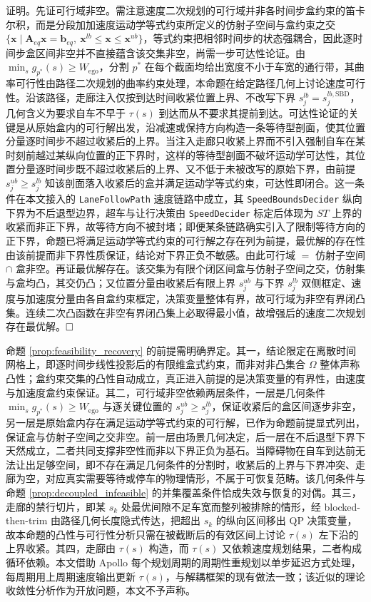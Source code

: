 \documentclass[a4paper,11pt]{ctexart}
\theoremstyle{definition}
\begin{document}
证明。先证可行域非空。需注意速度二次规划的可行域并非各时间步盒约束的笛卡尔积，而是分段加加速度运动学等式约束所定义的仿射子空间与盒约束之交 $\{\mathbf{x}\mid \mathbf{A}_{eq}\mathbf{x}=\mathbf{b}_{eq},\ \mathbf{x}^{lb}\le\mathbf{x}\le\mathbf{x}^{ub}\}$，等式约束把相邻时间步的状态强耦合，因此逐时间步盒区间非空并不直接蕴含该交集非空，尚需一步可达性论证。由 $\min_s g_{p^{*}}(s) \geq W_{\text{ego}}$，分割 $p^{*}$ 在每个截面均给出宽度不小于车宽的通行带，其曲率可行性由路径二次规划的曲率约束处理，本命题在给定路径几何上讨论速度可行性。沿该路径，走廊注入仅按到达时间收紧位置上界、不改写下界 $s_j^{lb}=s_j^{lb,\mathrm{SBD}}$，几何含义为要求自车不早于 $\tau(s)$ 到达而从不要求其提前到达。可达性论证的关键是从原始盒内的可行解出发，沿减速或保持方向构造一条等待型剖面，使其位置分量逐时间步不超过收紧后的上界。当注入走廊只收紧上界而不引入强制自车在某时刻前越过某纵向位置的正下界时，这样的等待型剖面不破坏运动学可达性，其位置分量逐时间步既不超过收紧后的上界、又不低于未被改写的原始下界，由前提 $s_j^{ub} \geq s_j^{lb}$ 知该剖面落入收紧后的盒并满足运动学等式约束，可达性即闭合。这一条件在本文接入的 \texttt{LaneFollowPath} 速度链路中成立，其 \texttt{SpeedBoundsDecider} 纵向下界为不后退型边界，超车与让行决策由 \texttt{SpeedDecider} 标定后体现为 $ST$ 上界的收紧而非正下界，故等待方向不被封堵；即便某条链路确实引入了限制等待方向的正下界，命题已将满足运动学等式约束的可行解之存在列为前提，最优解的存在性由该前提而非下界性质保证，结论对下界正负不敏感。由此可行域 $=$ 仿射子空间 $\cap$ 盒非空。再证最优解存在。该交集为有限个闭区间盒与仿射子空间之交，仿射集与盒均凸，其交仍凸；又位置分量由收紧后有限上界 $s_j^{ub}$ 与下界 $s_j^{lb}$ 双侧框定、速度与加速度分量由各自盒约束框定，决策变量整体有界，故可行域为非空有界闭凸集。连续二次凸函数在非空有界闭凸集上必取得最小值，故增强后的速度二次规划存在最优解。$\hfill\Box$

命题 \ref{prop:feasibility_recovery} 的前提需明确界定。其一，结论限定在离散时间网格上，即逐时间步线性投影后的有限维盒式约束，而非对非凸集合 $\Omega$ 整体声称凸性；盒约束交集的凸性自动成立，真正进入前提的是决策变量的有界性，由速度与加速度盒约束保证。其二，可行域非空依赖两层条件，一层是几何条件 $\min_s g_{p^{*}}(s) \geq W_{\text{ego}}$ 与逐关键位置的 $s_j^{ub} \geq s_j^{lb}$，保证收紧后的盒区间逐步非空，另一层是原始盒内存在满足运动学等式约束的可行解，已作为命题前提显式列出，保证盒与仿射子空间之交非空。前一层由场景几何决定，后一层在不后退型下界下天然成立，二者共同支撑非空性而非以下界正负为基石。当障碍物在自车到达前无法让出足够空间，即不存在满足几何条件的分割时，收紧后的上界与下界冲突、走廊为空，对应真实需要等待或停车的物理情形，不属于可恢复范畴。该几何条件与命题 \ref{prop:decoupled_infeasible} 的并集覆盖条件恰成失效与恢复的对偶。其三，走廊的禁行切片，即某 $s_k$ 处最优间隙不足车宽而整列被排除的情形，经 blocked-then-trim 由路径几何长度隐式传达，把超出 $s_k$ 的纵向区间移出 QP 决策变量，故本命题的凸性与可行性分析只需在被截断后的有效区间上讨论 $\tau(s)$ 左下沿的上界收紧。其四，走廊由 $\tau(s)$ 构造，而 $\tau(s)$ 又依赖速度规划结果，二者构成循环依赖。本文借助 Apollo 每个规划周期的周期性重规划以单步延迟方式处理，每周期用上周期速度输出更新 $\tau(s)$，与解耦框架的现有做法一致；该近似的理论收敛性分析作为开放问题，本文不予声称。
\end{document}
